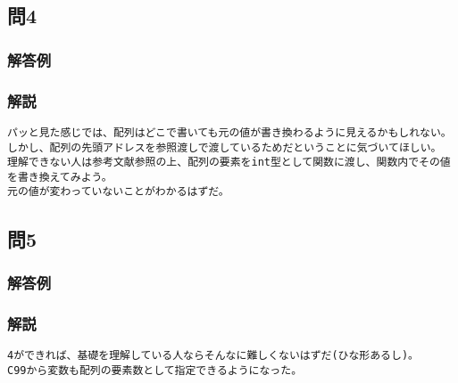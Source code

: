 \subsection{問4}
\subsubsection{解答例}

\subsubsection{解説}
\begin{verbatim}
パッと見た感じでは、配列はどこで書いても元の値が書き換わるように見えるかもしれない。
しかし、配列の先頭アドレスを参照渡しで渡しているためだということに気づいてほしい。
理解できない人は参考文献参照の上、配列の要素をint型として関数に渡し、関数内でその値を書き換えてみよう。
元の値が変わっていないことがわかるはずだ。
\end{verbatim}

\subsection{問5}
\subsubsection{解答例}

\subsubsection{解説}
\begin{verbatim}
4ができれば、基礎を理解している人ならそんなに難しくないはずだ(ひな形あるし)。
C99から変数も配列の要素数として指定できるようになった。

\end{verbatim}
